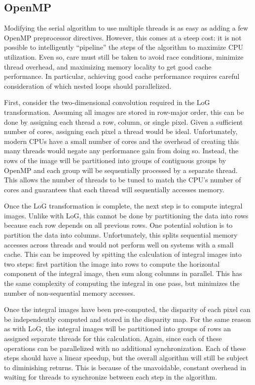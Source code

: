\documentclass{article}
\begin{document}
\subsection{OpenMP}
\label{sec:parallel-omp}
Modifying the serial algorithm to use multiple threads is as easy as adding a
few OpenMP preprocessor directives. However, this comes at a steep cost: it is
not possible to intelligently ``pipeline'' the steps of the algorithm to
maximize CPU utilization. Even so, care must still be taken to avoid race
conditions, minimize thread overhead, and maximizing memory locality to get
good cache performance. In particular, achieving good cache performance
requires careful consideration of which nested loops should parallelized. 

First, consider the two-dimensional convolution required in the LoG
transformation. Assuming all images are stored in row-major order, this can be
done by assigning each thread a row, column, or single pixel. Given a
sufficient number of cores, assigning each pixel a thread would be ideal.
Unfortunately, modern CPUs have a small number of cores and the overhead of
creating this many threads would negate any performance gain from doing so.
Instead, the rows of the image will be partitioned into groups of contiguous
groups by OpenMP and each group will be sequentially processed by a separate
thread. This allows the number of threads to be tuned to match the CPU's number
of cores and guarantees that each thread will sequentially accesses memory.

Once the LoG transformation is complete, the next step is to compute integral
images. Unlike with LoG, this cannot be done by partitioning the data into rows
because each row depends on all previous rows. One potential solution is to
partition the data into columns. Unfortunately, this splits sequential memory
accesses across threads and would not perform well on systems with a small
cache. This can be improved by spitting the calculation of integral images into
two steps: first partition the image into rows to compute the horizontal
component of the integral image, then sum along columns in parallel. This has
the same complexity of computing the integral in one pass, but minimizes the
number of non-sequential memory accesses.

Once the integral images have been pre-computed, the disparity of each pixel
can be independently computed and stored in the disparity map. For the same
reason as with LoG, the integral images will be partitioned into groups of rows
an assigned separate threads for this calculation. Again, since each of these
operations can be parallelized with no additional synchronization. Each of
these steps should have a linear speedup, but the overall algorithm will still
be subject to diminishing returns. This is because of the unavoidable, constant
overhead in waiting for threads to synchronize between each step in the
algorithm.
\end{document}
